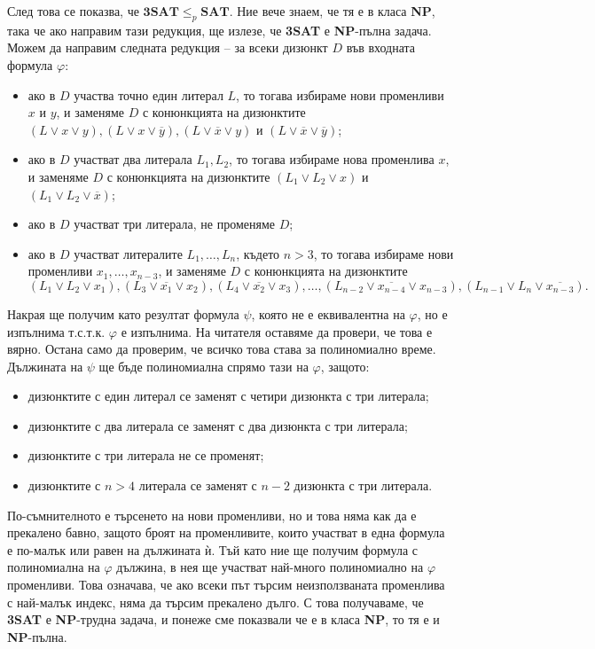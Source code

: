 \documentclass{article}
\newcommand{\NP}{\textbf{NP}}
\theoremstyle{definition}
\theoremstyle{plain}
\theoremstyle{remark}
\theoremstyle{definition}
\begin{document}
След това се показва, че $\mathbf{3SAT} \leq_p \mathbf{SAT}$.
Ние вече знаем, че тя е в класа \NP, така че ако направим тази редукция, ще излезе, че \textbf{3SAT} е \NP-пълна задача.
Можем да направим следната редукция -- за всеки дизюнкт $D$ във входната формула $\varphi$:
\begin{itemize}
    \item ако в $D$ участва точно един литерал $L$, то тогава избираме нови променливи $x$ и $y$, и заменяме $D$ с конюнкцията на дизюнктите $(L \lor x \lor y), (L \lor x \lor \overline{y}), (L \lor \overline{x} \lor y)$ и $(L \lor \overline{x} \lor \overline{y})$;
    \item ако в $D$ участват два литерала $L_1, L_2$, то тогава избираме нова променлива $x$, и заменяме $D$ с конюнкцията на дизюнктите $(L_1 \lor L_2 \lor x)$ и $(L_1 \lor L_2 \lor \overline{x})$;
    \item ако в $D$ участват три литерала, не променяме $D$;
    \item ако в $D$ участват литералите $L_1, \dots, L_n$, където $n > 3$, то тогава избираме нови променливи $x_1, \dots, x_{n - 3}$, и заменяме $D$ с конюнкцията на дизюнктите
          \[
              (L_1 \lor L_2 \lor x_1), (L_3 \lor \overline{x_1} \lor x_2), (L_4 \lor \overline{x_2} \lor x_3), \dots, (L_{n - 2} \lor \overline{x_{n - 4}} \lor x_{n - 3}), (L_{n - 1} \lor L_n \lor \overline{x_{n - 3}}).
          \]
\end{itemize}
Накрая ще получим като резултат формула $\psi$, която не е еквивалентна на $\varphi$, но е изпълнима т.с.т.к. $\varphi$ е изпълнима.
На читателя оставяме да провери, че това е вярно.
Остана само да проверим, че всичко това става за полиномиално време.
Дължината на $\psi$ ще бъде полиномиална спрямо тази на $\varphi$, защото:
\begin{itemize}
    \item дизюнктите с един литерал се заменят с четири дизюнкта с три литерала;
    \item дизюнктите с два литерала се заменят с два дизюнкта с три литерала;
    \item дизюнктите с три литерала не се променят;
    \item дизюнктите с $n > 4$ литерала се заменят с $n - 2$ дизюнкта с три литерала.
\end{itemize}
По-съмнителното е търсенето на нови променливи, но и това няма как да е прекалено бавно, защото броят на променливите, които участват в една формула е по-малък или равен на дължината ѝ.
Тъй като ние ще получим формула с полиномиална на $\varphi$ дължина, в нея ще участват най-много полиномиално на $\varphi$ променливи.
Това означава, че ако всеки път търсим неизползваната променлива с най-малък индекс, няма да търсим прекалено дълго.
С това получаваме, че \textbf{3SAT} е \NP-трудна задача, и понеже сме показвали че е в класа \NP, то тя е и \NP-пълна.
\end{document}
